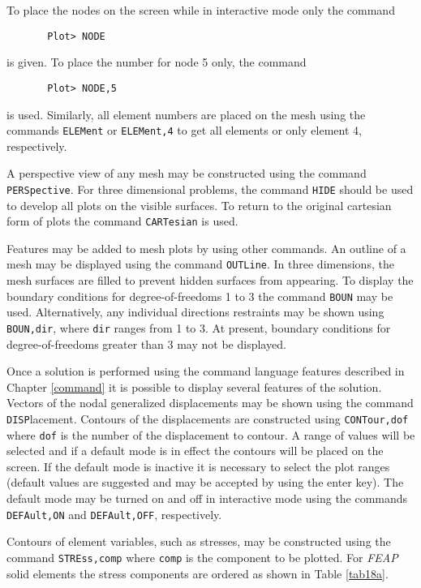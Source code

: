 To place the nodes on the screen while in interactive mode only the command
\begin{verbatim}
       Plot> NODE
\end{verbatim}
is given.  To place the number for node 5 only, the command
\begin{verbatim}
       Plot> NODE,5
\end{verbatim}
is used.  Similarly, all element numbers are placed on the mesh using the
commands {\tt ELEMent} or {\tt ELEMent,4}
to get all elements or only element 4, respectively.

A perspective view of any mesh may be constructed using the command
{\tt PERSpective}.  For three dimensional problems, the command {\tt HIDE}
should be used to develop all plots on the visible surfaces.  To return to
the original cartesian form of plots the command {\tt CARTesian} is used.

Features may be added to mesh plots by using other commands.
An outline of a mesh may be displayed using the command {\tt OUTLine}.
In three dimensions, the mesh surfaces are filled to prevent hidden surfaces
from appearing.  To display the
boundary conditions for degree-of-freedoms 1 to 3 the command {\tt BOUN}
may be used.  Alternatively, any individual directions restraints may be
shown using {\tt BOUN,dir}, where {\tt dir} ranges from 1 to 3.  At present,
boundary conditions for degree-of-freedoms greater than 3 may not be displayed.

Once a solution is performed using the command language features described
in Chapter \ref{command} it is possible to display several features of
the solution.  Vectors of the nodal generalized displacements may be shown
using the command {\tt DISP}lacement.  Contours of the displacements are
constructed using {\tt CONTour,dof} where {\tt dof} is the number of the
displacement to contour.  A range of values will be selected and if a
default mode is in effect the contours will be placed on the screen.  If
the default mode is inactive it is necessary to select the plot ranges (default
values are suggested and may be accepted by using the enter key).  The
default mode may be turned on and off in interactive mode using the
commands {\tt DEFAult,ON} and {\tt DEFAult,OFF}, respectively.

Contours of element variables, such as stresses, may be constructed using
the command {\tt STREss,comp} where {\tt comp} is the component to be plotted.
For {\sl FEAP} solid elements the stress components are ordered as shown in
Table \ref{tab18a}.

